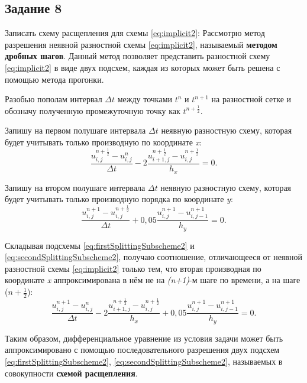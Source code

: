 \documentclass[12pt, a4paper]{report}
\begin{document}
	\subsection*{Задание 8}
	\large
	Записать схему расщепления для схемы \eqref{eq:implicit2}:
	Рассмотрю метод разрешения неявной разностной схемы \eqref{eq:implicit2}, называемый \textbf{методом дробных шагов}. Данный метод позволяет представить разностной схему \eqref{eq:implicit2} в виде двух подсхем, каждая из которых может быть решена с помощью метода прогонки. \par
	Разобью пополам интервал $\Delta t$ между точками $t^{n}$ и $t^{n+1}$ на разностной сетке и обозначу полученную промежуточную точку как $t^{n+\frac{1}{2}}$. \par
	Запишу на первом полушаге интервала $\Delta t$ неявную разностную схему, которая будет учитывать только производную по координате \textit{x}:
	\begin{equation}\label{eq:firstSplittingSubscheme2}
		\frac{u_{i, j}^{n+\frac{1}{2}} - u_{i, j}^{n}}{\Delta t} - 2\frac{u_{i+1, j}^{n+\frac{1}{2}} - u_{i, j}^{n+\frac{1}{2}}}{h_{x}} = 0.
	\end{equation}
	\par
	Запишу на втором полушаге интервала $\Delta t$ неявную разностную схему, которая будет учитывать только производную порядка по координате \textit{y}:
	\begin{equation}\label{eq:secondSplittingSubscheme2}
		\frac{u_{i, j}^{n+1} - u_{i, j}^{n+\frac{1}{2}}}{\Delta t} + 0,05\frac{u_{i, j}^{n+1} - u_{i, j-1}^{n+1}}{h_{y}} = 0.
	\end{equation}
	\par
	Складывая подсхемы \eqref{eq:firstSplittingSubscheme2} и \eqref{eq:secondSplittingSubscheme2}, получаю соотношение, отличающееся от неявной разностной схемы \eqref{eq:implicit2} только тем, что вторая производная по координате \textit{x} аппроксимирована в нём не на \textit{(n+1)}-м шаге по времени, а на шаге ($n+\frac{1}{2}$):
	\begin{equation}\label{eq:splittingScheme2}
		\frac{u_{i, j}^{n+1} - u_{i, j}^{n}}{\Delta t} - 2\frac{u_{i+1, j}^{n+\frac{1}{2}} - u_{i, j}^{n+\frac{1}{2}}}{h_{x}} + 0,05\frac{u_{i, j}^{n+1} - u_{i, j-1}^{n+1}}{h_{y}} = 0.
	\end{equation}
	\par
	\large
	Таким образом, дифференциальное уравнение из условия задачи может быть аппроксимировано с помощью последовательного разрешения двух подсхем \eqref{eq:firstSplittingSubscheme2}, \eqref{eq:secondSplittingSubscheme2}, называемых в совокупности \textbf{схемой расщепления}.
\end{document}
